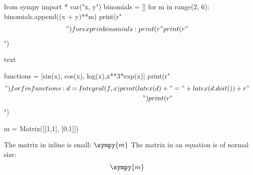 \documentclass{article}
\begin{document}
\begin{pycode}
from sympy import *
var("x, y")
binomials = []
for m in range(2, 6):
	binomials.append((x + y)**m)
print(r"\begin{align*}")
for expr in binomials:
	print(r"%
print(r"\end{align*}")
\end{pycode}

text
\begin{pycode}
functions = [sin(x), cos(x), log(x),x**3*exp(x)]
print(r"\begin{align*}")
for f in functions:
	d = Integral(f, x)
	print(latex(d) + "&=" + latex(d.doit()) + r"\\")
print(r"\end{align*}")
\end{pycode}


\begin{sympycode}
m = Matrix([[1,1], [0,1]])
\end{sympycode}
The matrix in inline is small: $\sympy{m}$
The matrix in an equation is of normal size:
\[ \sympy{m} \]
\end{document}
